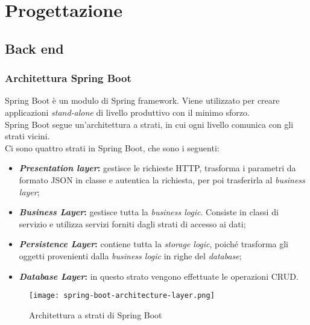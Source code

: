 \section{Progettazione}
\label{sec:progettazione}

\subsection{Back end}
\subsubsection{Architettura Spring Boot}
Spring Boot è un modulo di Spring \gls{framework}. Viene utilizzato per creare
applicazioni \textit{stand-alone} di livello produttivo con il minimo sforzo.\\
Spring Boot segue un'architettura a strati, in cui ogni livello comunica con
gli strati vicini.\\
Ci sono quattro strati in Spring Boot, che sono i seguenti:
\begin{itemize}
    \item \textbf{\textit{Presentation layer}:} gestisce le richieste HTTP,
          trasforma i parametri da formato JSON in classe e autentica la
          richiesta, per
          poi trasferirla al \textit{business layer};
    \item \textbf{\textit{Business Layer}:} gestisce tutta la \textit{business
              logic}. Consiste in classi di servizio e utilizza servizi forniti
          dagli strati
          di accesso ai dati;
    \item \textbf{\textit{Persistence Layer}:} contiene tutta la
          \textit{storage logic}, poiché trasforma gli oggetti provenienti
          dalla
          \textit{business logic} in righe del \textit{database};
    \item \textbf{\textit{Database Layer}:} in questo strato vengono effettuate
          le operazioni \gls{CRUD}.
\end{itemize}
\begin{figure}[H]
    \centering
    \texttt{[image: spring-boot-architecture-layer.png]}
    \caption{Architettura a strati di Spring Boot}
\end{figure}

